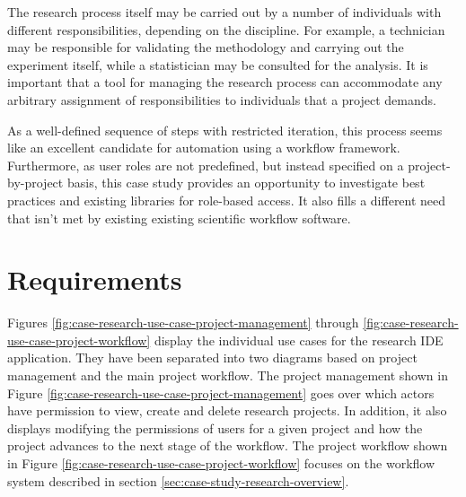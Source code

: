 \documentclass[document.tex]{subfiles}
\begin{document}
The research process itself may be carried out by a number of individuals with different responsibilities, depending on the discipline. For example, a technician may be responsible for validating the methodology and carrying out the experiment itself, while a statistician may be consulted for the analysis. It is important that a tool for managing the research process can accommodate any arbitrary assignment of responsibilities to individuals that a project demands.

As a well-defined sequence of steps with restricted iteration, this process seems like an excellent candidate for automation using a workflow framework. Furthermore, as user roles are not predefined, but instead specified on a project-by-project basis, this case study provides an opportunity to investigate best practices and existing libraries for role-based access.
It also fills a different need that isn't met by existing existing scientific workflow software. 


\section {Requirements}
\label{sec:case-research-requirements}

  Figures \ref{fig:case-research-use-case-project-management} through \ref{fig:case-research-use-case-project-workflow} display the individual use cases for the research IDE application. They have been separated into two diagrams based on project management and the main project workflow. The project management shown in Figure \ref{fig:case-research-use-case-project-management} goes over which actors have permission to view, create and delete research projects. In addition, it also displays modifying the permissions of users for a given project and how the project advances to the next stage of the workflow. The project workflow shown in Figure \ref{fig:case-research-use-case-project-workflow} focuses on the workflow system described in section \ref{sec:case-study-research-overview}.
\end{document}
